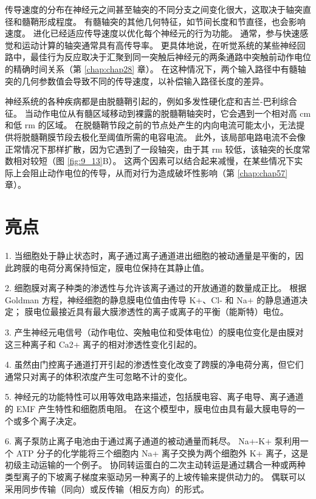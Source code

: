 传导速度的分布在神经元之间甚至轴突的不同分支之间变化很大，这取决于轴突直径和髓鞘形成程度。 
有髓轴突的其他几何特征，如节间长度和节直径，也会影响速度。 
进化已经适应传导速度以优化每个神经元的行为功能。 
通常，参与快速感觉和运动计算的轴突通常具有高传导率。 
更具体地说，在听觉系统的某些神经回路中，最佳行为反应取决于汇聚到同一突触后神经元的两条通路中突触前动作电位的精确时间关系（第 \ref{chap:chap28} 章）。 
在这种情况下，两个输入路径中有髓轴突的几何参数值会导致不同的传导速度，以补偿输入路径长度的差异。


神经系统的各种疾病都是由脱髓鞘引起的，例如多发性硬化症和吉兰-巴利综合征。 
当动作电位从有髓区域移动到裸露的脱髓鞘轴突时，它会遇到一个相对高 cm 和低 rm 的区域。 
在脱髓鞘节段之前的节点处产生的内向电流可能太小，无法提供将脱髓鞘膜节段去极化至阈值所需的电容电流。 
此外，该局部电路电流不会像正常情况下那样扩散，因为它遇到了一段轴突，由于其 rm 较低，该轴突的长度常数相对较短（图 \ref{fig:9_13}B）。 
这两个因素可以结合起来减慢，在某些情况下实际上会阻止动作电位的传导，从而对行为造成破坏性影响（第 \ref{chap:chap57} 章）。


\section{亮点}

1. 当细胞处于静止状态时，离子通过离子通道进出细胞的被动通量是平衡的，因此跨膜的电荷分离保持恒定，膜电位保持在其静止值。 


2. 细胞膜对离子种类的渗透性与允许该离子通过的开放通道的数量成正比。 
根据 Goldman 方程，神经细胞的静息膜电位值由传导 K+、Cl- 和 Na+ 的静息通道决定； 
膜电位最接近具有最大膜渗透性的离子或离子的平衡（能斯特）电位。 


3. 产生神经元电信号（动作电位、突触电位和受体电位）的膜电位变化是由膜对这三种离子和 Ca2+ 离子的相对渗透性变化引起的。 


4. 虽然由门控离子通道打开引起的渗透性变化改变了跨膜的净电荷分离，但它们通常只对离子的体积浓度产生可忽略不计的变化。 


5. 神经元的功能特性可以用等效电路来描述，包括膜电容、离子电导、离子通道的 EMF 产生特性和细胞质电阻。 
在这个模型中，膜电位由具有最大膜电导的一个或多个离子决定。 


6. 离子泵防止离子电池由于通过离子通道的被动通量而耗尽。 
Na+-K+ 泵利用一个 ATP 分子的化学能将三个细胞内 Na+ 离子交换为两个细胞外 K+ 离子，这是初级主动运输的一个例子。 
协同转运蛋白的二次主动转运是通过耦合一种或两种类型离子的下坡离子梯度来驱动另一种离子的上坡传输来提供动力的。 
偶联可以采用同步传输（同向）或反传输（相反方向）的形式。 


